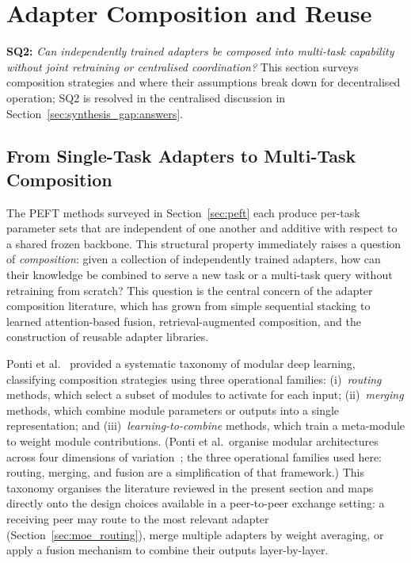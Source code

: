 \section{Adapter Composition and Reuse}
\label{sec:adapter_composition}

\noindent\textbf{SQ2:} \textit{Can independently trained adapters be composed
into multi-task capability without joint retraining or centralised
coordination?} This section surveys composition strategies and where their
assumptions break down for decentralised operation; SQ2 is resolved in the
centralised discussion in Section~\ref{sec:synthesis_gap:answers}.

\subsection{From Single-Task Adapters to Multi-Task Composition}
\label{sec:adapter_composition:intro}

The PEFT methods surveyed in Section~\ref{sec:peft} each produce per-task parameter
sets that are independent of one another and additive with respect to a shared frozen
backbone. This structural property immediately raises a question of \textit{composition}:
given a collection of independently trained adapters, how can their knowledge be combined
to serve a new task or a multi-task query without retraining from scratch? This question
is the central concern of the adapter composition literature, which has grown from simple
sequential stacking to learned attention-based fusion, retrieval-augmented composition,
and the construction of reusable adapter libraries.

Ponti et al.~\cite{Ponti2023} provided a systematic taxonomy of modular deep learning, classifying
composition strategies using three operational families: (i)~\textit{routing} methods, which select
a subset of modules to activate for each input; (ii)~\textit{merging} methods, which
combine module parameters or outputs into a single representation; and
(iii)~\textit{learning-to-combine} methods, which train a meta-module to weight module
contributions. (Ponti et al.\ organise modular architectures across four dimensions of
variation~\cite{Ponti2023}; the three operational families used here: routing, merging,
and fusion are a simplification of that framework.) This taxonomy organises the literature
reviewed in the present section and maps directly onto the design choices available in a
peer-to-peer exchange setting: a receiving peer may route to the most relevant adapter
(Section~\ref{sec:moe_routing}), merge multiple adapters by weight averaging, or apply a
fusion mechanism to combine their outputs layer-by-layer.

